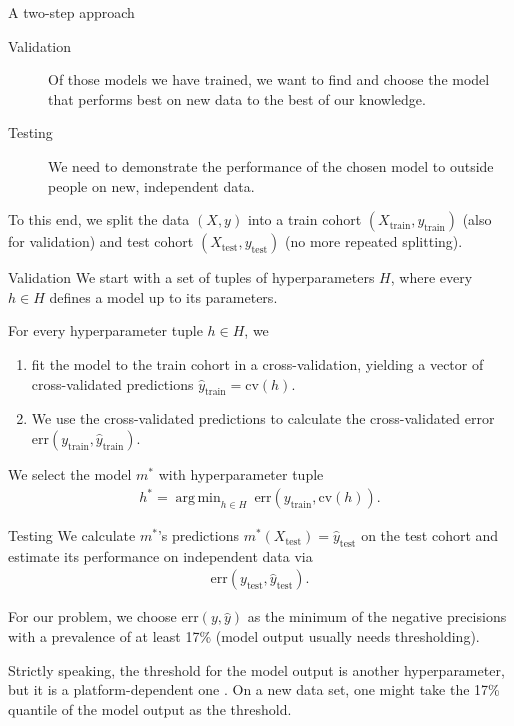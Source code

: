 \documentclass[10pt, aspectratio=169]{beamer}
\DeclareMathOperator*{\argmin}{arg\,min}
\begin{document}
\begin{frame}{A two-step approach}
  \begin{description}
    \item[Validation] Of those models we have trained, we want to find and choose
       the model that performs best on new data to the best of \alert{our} knowledge.
    \item[Testing] We need to demonstrate the performance of the chosen model to 
      \alert{outside} people on new, independent data.
  \end{description}

  To this end, we split the data $(X, y)$ into a train cohort 
  $(X_{\text{train}}, y_{\text{train}})$ (also for validation) and test 
  cohort $(X_{\text{test}}, y_{\text{test}})$ (no more repeated splitting).
\end{frame}

\begin{frame}{Validation}
  We start with a set of tuples of hyperparameters $H$, where every $h \in H$ 
  defines a model up to its parameters.

  For every hyperparameter tuple $h \in H$, we

  \begin{enumerate}
    \item fit the model to the train cohort 
    in a cross-validation, yielding a vector of cross-validated predictions 
    $\hat{y}_\text{train} = \text{cv}(h)$.
    \item We use the cross-validated predictions to calculate the 
      cross-validated error $\text{err}(y_{\text{train}}, \hat{y}_\text{train})$.
  \end{enumerate}

  We select the model $m^*$ with hyperparameter tuple
  \begin{align*}
    h^* = \argmin_{h \in H} \ \text{err}(y_\text{train}, \text{cv}(h)).
  \end{align*}
\end{frame}

\begin{frame}{Testing}
  We calculate $m^*$'s predictions $m^*(X_\text{test}) = \hat{y}_{\text{test}}$ 
  on the test cohort and estimate its performance on independent data via
  \begin{align*}
    \text{err}(y_{\text{test}}, \hat{y}_{\text{test}}).
  \end{align*}

  For our problem, we choose $\text{err}(y, \hat{y})$ as the minimum of the 
  negative precisions with a prevalence of at least 17\% (model output usually 
  needs thresholding).

  Strictly speaking, the threshold for the model output is another hyperparameter, 
  but it is a platform-dependent one \citep{transplatform17}. On a new data set, 
  one might take the 17\% quantile of the model output as the threshold.
\end{frame}
\end{document}
